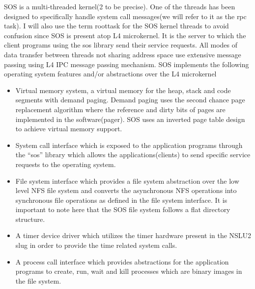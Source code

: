 \documentclass[a4paper, 11pt]{article}
\begin{document}
SOS is a multi-threaded kernel(2 to be precise). One of the threads
has been designed to specifically handle system call messages(we will
refer to it as the rpc task). I will also use the term roottask for
the SOS kernel threads to avoid confusion since SOS is present atop L4 
microkernel. It is
the server to which the client programs using the sos library send
their service requests. All modes of data transfer between threads not
sharing address space use extensive message passing using L4 IPC
message passing mechanism. SOS implements the following operating
system features and/or abstractions over the L4 microkernel
\begin{itemize}
\item Virtual memory system, a virtual memory for the heap, stack and
  code segments with demand paging. Demand paging uses the second
  chance page replacement algorithm where the reference and dirty bits
  of pages are implemented in the software(pager). SOS uses an
  inverted page table design to achieve virtual memory support.
\item System call interface which is exposed to the application
  programs through the ``sos'' library which allows the
  applications(clients) to send specific service requests to the
  operating system.
\item File system interface which provides a file system abstraction
  over the low level NFS file system \cite{nfs-rfc} and converts the 
  asynchronous NFS
  operations into synchronous file operations as defined in the file
  system interface. It is important to note here that the SOS file
  system follows a flat directory structure.
\item A timer device driver which utilizes the timer hardware present
  in the NSLU2 slug in order to provide the time related system calls.
\item A process call interface which provides abstractions for the
  application programs to create, run, wait and kill processes which
  are binary images in the file system.
\end{itemize} 
\end{document}
